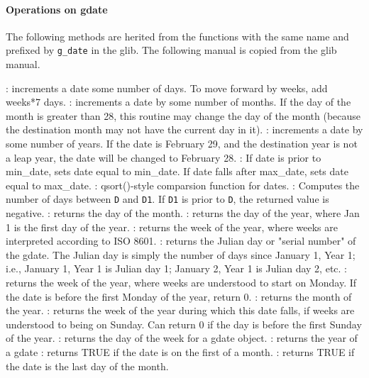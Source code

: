 \paragraph{Operations on gdate}
The following methods are herited from the functions with the same name and prefixed 
by \verb+g_date+ in the glib. The following manual is copied from the glib manual.
  \begin{varlist}
    : increments a date some number of days. To move forward by weeks, add weeks*7 days. 
    : increments a date by some number of months. If the day of the month is greater than 28, 
    this routine may change the day of the month (because the destination month may not have the current day in it). 
    : increments a date by some number of years. If the date is February 29, 
    and the destination year is not a leap year, the date will be changed to February 28. 
    : If date is prior to min_date, sets date equal to min_date. If date falls 
    after max_date, sets date equal to max_date. 
    : qsort()-style comparsion function for dates.
    : Computes the number of days between \verb+D+ and \verb+D1+.
    If \verb+D1+ is prior to \verb+D+, the returned value is negative. 
    : returns the day of the month.
    : returns the day of the year, where Jan 1 is the first day of the year. 
    : returns the week of the year, where weeks are interpreted according to ISO 8601.
    : returns the Julian day or "serial number" of the gdate. The Julian day is simply the number 
    of days since January 1, Year 1; i.e., January 1, Year 1 is Julian day 1; January 2, Year 1 is Julian day 2, etc. 
    : returns the week of the year, where weeks are understood to start on Monday. 
    If the date is before the first Monday of the year, return 0. 
    : returns the month of the year.
    : returns the week of the year during which this date falls, if weeks are understood to being on Sunday.  Can return 0 if the day is before the first Sunday of the year.
    : returns the day of the week for a gdate object.
    : returns the year of a gdate
    : returns TRUE if the date is on the first of a month. 
    : returns TRUE if the date is the last day of the month. 

\end{varlist}

